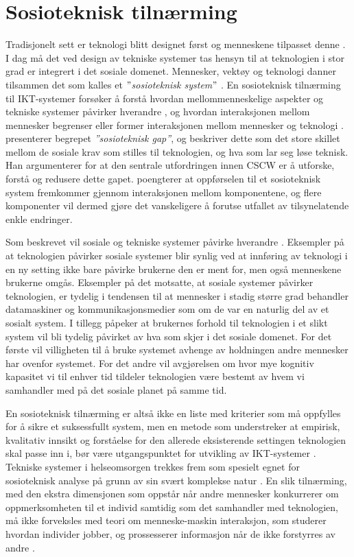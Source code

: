 \section{Sosioteknisk tilnærming}
\label{sec:sosioteknisk}
Tradisjonelt sett er teknologi blitt designet først og menneskene tilpasset denne \citep{Appelbaum97}. I dag må det ved design av tekniske systemer tas hensyn til at teknologien i stor grad er integrert i det sosiale domenet. Mennesker, vektøy og teknologi danner tilsammen det som kalles et \textit{$"$sosioteknisk system$"$} \citep{Coiera04}. En sosioteknisk tilnærming til IKT-systemer forsøker å forstå hvordan mellommenneskelige aspekter og tekniske systemer påvirker hverandre \citep{Coiera04}, og hvordan interaksjonen mellom mennesker begrenser eller former interaksjonen mellom mennesker og teknologi \citep{Coiera07}. \citet{Ackerman00} presenterer begrepet \textit{”sosioteknisk gap”}, og beskriver dette som det store skillet mellom de sosiale krav som stilles til teknologien, og hva som lar seg løse teknisk. Han argumenterer for at den sentrale utfordringen innen CSCW er å utforske, forstå og redusere dette gapet. \citet{Coiera04} poengterer at oppførselen til et sosioteknisk system fremkommer gjennom interaksjonen mellom komponentene, og flere komponenter vil dermed gjøre det vanskeligere å forutse utfallet av tilsynelatende enkle endringer. 

\noindent
Som beskrevet vil sosiale og tekniske systemer påvirke hverandre \citep{Coiera04}. Eksempler på at teknologien påvirker sosiale systemer blir synlig ved at innføring av teknologi i en ny setting ikke bare påvirke brukerne den er ment for, men også menneskene brukerne omgås. Eksempler på det motsatte, at sosiale systemer påvirker teknologien, er tydelig i tendensen til at mennesker i stadig større grad behandler datamaskiner og kommunikasjonsmedier som om de var en naturlig del av et sosialt system. I tillegg påpeker \citet{Coiera07} at brukernes forhold til teknologien i et slikt system vil bli tydelig påvirket av hva som skjer i det sosiale domenet. For det første vil villigheten til å bruke systemet avhenge av holdningen andre mennesker har ovenfor systemet. For det andre vil avgjørelsen om hvor mye kognitiv kapasitet vi til enhver tid tildeler teknologien være bestemt av hvem vi samhandler med på det sosiale planet på samme tid.

\noindent
En sosioteknisk tilnærming er altså ikke en liste med kriterier som må oppfylles for å sikre et suksessfullt system, men en metode som understreker at empirisk, kvalitativ innsikt og forståelse for den allerede eksisterende settingen teknologien skal passe inn i, bør være utgangspunktet for utvikling av IKT-systemer \citep{Berg99}. Tekniske systemer i helseomsorgen trekkes frem som spesielt egnet for sosioteknisk analyse på grunn av sin svært komplekse natur \citep{Coiera07, Berg99}. En slik tilnærming, med den ekstra dimensjonen som oppstår når andre mennesker konkurrerer om oppmerksomheten til et individ samtidig som det samhandler med teknologien, må ikke forveksles med teori om menneske-maskin interaksjon, som studerer hvordan individer jobber, og prossesserer informasjon når de ikke forstyrres av andre \citep{Coiera07}.
